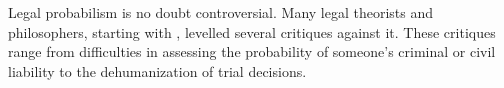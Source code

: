 \documentclass{article}
\begin{document}
Legal probabilism is no doubt controversial. 
Many legal theorists and philosophers, starting with \cite{tribe71}, levelled several critiques against it. These critiques range from  difficulties in assessing the probability of someone's criminal or civil liability to the dehumanization of trial decisions. 
%
\end{document}
